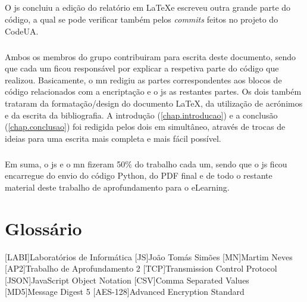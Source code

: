\documentclass[a4paper]{report}
\begin{document}
\paragraph{}O \ac{js} concluiu a edição do relatório em \LaTeX e escreveu outra grande parte do código, a qual se pode verificar também pelos \textit{commits} feitos no projeto do CodeUA.

\paragraph{}Ambos os membros do grupo contribuiram para escrita deste documento, sendo que cada um ficou responsável por explicar a respetiva parte do código que realizou. Basicamente, o \ac{mn} redigiu as partes correspondentes aos blocos de código relacionados com a encriptação e o \ac{js} as restantes partes.
Os dois também trataram da formatação/design do documento \LaTeX, da utilização de acrónimos e da escrita da bibliografia. 
A introdução (\autoref{chap.introducao}) e a conclusão (\autoref{chap.conclusao}) foi redigida pelos dois em simultâneo, através de trocas de ideias para uma escrita mais completa e mais fácil possível. 

\paragraph{}Em suma, o \ac{js} e o \ac{mn} fizeram 50\% do trabalho cada um, sendo que o \ac{js} ficou encarregue do envio do código Python, do PDF final e de todo o restante material deste trabalho de aprofundamento para o eLearning.

\chapter{Glossário}
\begin{acronym}
[LABI]{Laboratórios de Informática}
[JS]{João Tomás Simões}
[MN]{Martim Neves}
[AP2]{Trabalho de Aprofundamento 2}
[TCP]{Transmission Control Protocol}
[JSON]{JavaScript Object Notation}
[CSV]{Comma Separated Values}
[MD5]{Message Digest 5}
[AES-128]{Advanced Encryption Standard}
\end{acronym}



\end{document}
